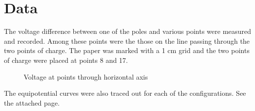 \documentclass[11pt]{article}
\begin{document}
\section{Data}
The voltage difference between one of the poles and various points were measured and recorded. Among these points were the those on the line passing through the two points of charge. The paper was marked with a 1 cm grid and the two points of charge were placed at points 8 and 17.
\begin{figure}[h]
	\centering
	\caption{Voltage at points through horizontal axis }
\end{figure}

The equipotential curves were also traced out for each of the configurations. See the attached page.
\end{document}
